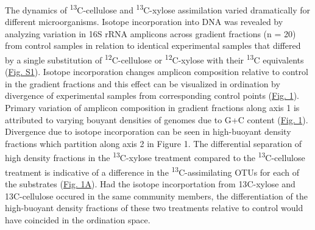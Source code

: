 The dynamics of \textsuperscript{13}C-cellulose and \textsuperscript{13}C-xylose assimilation varied dramatically for different microorganisms. Isotope incorporation into DNA was revealed by analyzing variation in 16S rRNA amplicons across gradient fractions (n = 20) from control samples in relation to identical experimental samples that differed by a single substitution of \textsuperscript{12}C-cellulose or \textsuperscript{12}C-xylose with their \textsuperscript{13}C equivalents (\href{https://www.authorea.com/users/3537/articles/8459/master/file/figures/20140708_ConceptualFig2/20140708_ConceptualFig2.pdf}{Fig. S1}). Isotope incorporation changes amplicon composition relative to control in the gradient fractions and this effect can be visualized in ordination by divergence of experimental samples from corresponding control points (\href{https://www.authorea.com/users/3537/articles/3612/master/file/figures/ordination_all1/ordination_all1.png}{Fig. 1}). Primary variation of amplicon composition in gradient fractions along axis 1 is attributed to varying bouyant densities of genomes due to G+C content (\href{https://www.authorea.com/users/3537/articles/3612/master/file/figures/ordination_all1/ordination_all1.png}{Fig. 1}). Divergence due to isotope incorporation can be seen in high-buoyant density fractions which partition along axis 2 in Figure 1. The differential separation of high density fractions in the \textsuperscript{13}C-xylose treatment compared to the \textsuperscript{13}C-cellulose treatment is indicative of a difference in the \textsuperscript{13}C-assimilating OTUs for each of the substrates (\href{https://www.authorea.com/users/3537/articles/3612/master/file/figures/ordination_all1/ordination_all1.png}{Fig. 1A}). Had the isotope incorportation from {13}C-xylose and {13}C-cellulose occured in the same community members, the differentiation of the high-buoyant density fractions of these two treatments relative to control would have coincided in the ordination space.  

